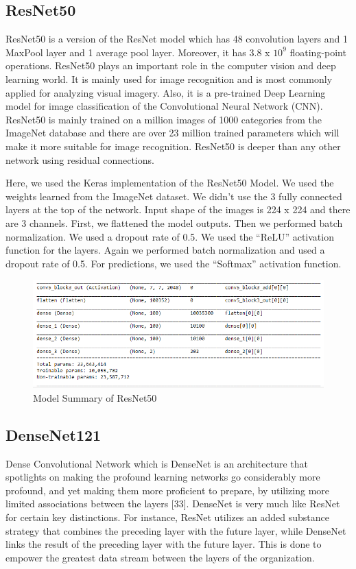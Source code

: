 \subsection{ResNet50}
ResNet50 is a version of the ResNet model which has 48 convolution layers and 1 MaxPool layer and 1 average pool layer. Moreover, it has 3.8 x \(10^9\) floating-point operations. ResNet50 plays an important role in the computer vision and deep learning world. It is mainly used for image recognition and is most commonly applied for analyzing visual imagery. Also, it is a pre-trained Deep Learning model for image classification of the Convolutional Neural Network (CNN). ResNet50 is mainly trained on a million images of 1000 categories from the ImageNet database and there are over 23 million trained parameters which will make it more suitable for image recognition. ResNet50 is deeper than any other network using residual connections.

\vspace{5mm}
Here, we used the Keras implementation of the ResNet50 Model. We used the weights learned from the ImageNet dataset. We didn’t use the 3 fully connected layers at the top of the network. Input shape of the images is 224 x 224 and there are 3 channels. First, we flattened the model outputs. Then we performed batch normalization. We used a dropout rate of 0.5. We used the “ReLU” activation function for the layers. Again we performed batch normalization and used a dropout rate of 0.5. For predictions, we used the “Softmax” activation function. 

\vspace{5mm}
\begin{figure}[hbt!]
\centering
\includegraphics[scale=0.75]{images/ResNet50.PNG}
\caption{Model Summary of ResNet50}
\label{fig:x Model Summary of ResNet50}
\end{figure}

\subsection{DenseNet121}
Dense Convolutional Network which is DenseNet is an architecture that spotlights on making the profound learning networks go considerably more profound, and yet making them more proficient to prepare, by utilizing more limited associations between the layers [33]. DenseNet is very much like ResNet for certain key distinctions. For instance, ResNet utilizes an added substance strategy that combines the preceding layer with the future layer, while DenseNet links the result of the preceding layer with the future layer. This is done to empower the greatest data stream between the layers of the organization.

